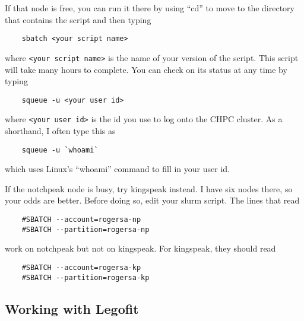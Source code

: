\documentclass[11pt]{article}
\begin{document}
If that node is free, you can run it there by using ``cd'' to move to
the directory that contains the script and then typing
\begin{verbatim}
    sbatch <your script name>
\end{verbatim}
where \verb|<your script name>| is the name of your version of the
script. This script will take many hours to complete. You can check on
its status at any time by typing
\begin{verbatim}
    squeue -u <your user id>
\end{verbatim}
where \verb|<your user id>| is the id you use to log onto the CHPC cluster.
As a shorthand, I often type this as
\begin{verbatim}
    squeue -u `whoami`
\end{verbatim}
which uses Linux's ``whoami'' command to fill in your user id.

If the notchpeak node is busy, try kingspeak instead. I have six nodes
there, so your odds are better. Before doing so, edit your slurm
script. The lines that read
\begin{verbatim}
    #SBATCH --account=rogersa-np
    #SBATCH --partition=rogersa-np
\end{verbatim}
work on notchpeak but not on kingspeak. For kingspeak, they should read
\begin{verbatim}
    #SBATCH --account=rogersa-kp
    #SBATCH --partition=rogersa-kp
\end{verbatim}

\subsection{Working with Legofit}
\end{document}
